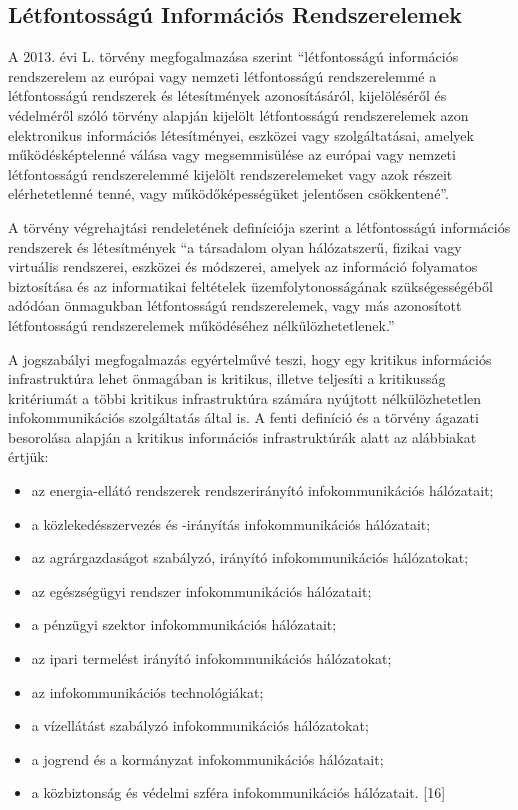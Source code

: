 \documentclass[12pt,magyar,a4paper,oneside]{scrreprt}
\providecommand{\tightlist}{%
  \setlength{\itemsep}{0pt}\setlength{\parskip}{0pt}}
\begin{document}
\hypertarget{sec:LIRE}{%
\subsection{Létfontosságú Információs Rendszerelemek}\label{sec:LIRE}}

A 2013. évi L. törvény megfogalmazása szerint ``létfontosságú
információs rendszerelem az európai vagy nemzeti létfontosságú
rendszerelemmé a létfontosságú rendszerek és létesítmények
azonosításáról, kijelöléséről és védelméről szóló törvény alapján
kijelölt létfontosságú rendszerelemek azon elektronikus információs
létesítményei, eszközei vagy szolgáltatásai, amelyek működésképtelenné
válása vagy megsemmisülése az európai vagy nemzeti létfontosságú
rendszerelemmé kijelölt rendszerelemeket vagy azok részeit
elérhetetlenné tenné, vagy működőképességüket jelentősen csökkentené''.

A törvény végrehajtási rendeletének definíciója szerint a létfontosságú
információs rendszerek és létesítmények ``a társadalom olyan
hálózatszerű, fizikai vagy virtuális rendszerei, eszközei és módszerei,
amelyek az információ folyamatos biztosítása és az informatikai
feltételek üzemfolytonosságának szükségességéből adódóan önmagukban
létfontosságú rendszerelemek, vagy más azonosított létfontosságú
rendszerelemek működéséhez nélkülözhetetlenek.''

A jogszabályi megfogalmazás egyértelművé teszi, hogy egy kritikus
információs infrastruktúra lehet önmagában is kritikus, illetve
teljesíti a kritikusság kritériumát a többi kritikus infrastruktúra
számára nyújtott nélkülözhetetlen infokommunikációs szolgáltatás által
is. A fenti definíció és a törvény ágazati besorolása alapján a kritikus
információs infrastruktúrák alatt az alábbiakat értjük:

\begin{itemize}
\tightlist
\item
  az energia-ellátó rendszerek rendszerirányító infokommunikációs
  hálózatait;
\item
  a közlekedésszervezés és -irányítás infokommunikációs hálózatait;
\item
  az agrárgazdaságot szabályzó, irányító infokommunikációs hálózatokat;
\item
  az egészségügyi rendszer infokommunikációs hálózatait;
\item
  a pénzügyi szektor infokommunikációs hálózatait;
\item
  az ipari termelést irányító infokommunikációs hálózatokat;
\item
  az infokommunikációs technológiákat;
\item
  a vízellátást szabályzó infokommunikációs hálózatokat;
\item
  a jogrend és a kormányzat infokommunikációs hálózatait;
\item
  a közbiztonság és védelmi szféra infokommunikációs hálózatait.
  {[}16{]}
\end{itemize}
\end{document}
